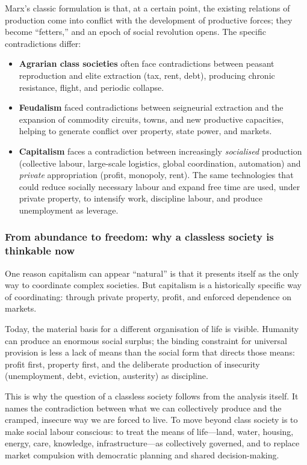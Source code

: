 Marx’s classic formulation is that, at a certain point, the existing relations of production come into conflict with the development of
productive forces; they become ``fetters,'' and an epoch of social revolution opens.\cite{Marx1859} The specific contradictions differ:

\begin{itemize}[leftmargin=1.5em]
  \item \textbf{Agrarian class societies} often face contradictions between peasant reproduction and elite extraction (tax, rent, debt),
        producing chronic resistance, flight, and periodic collapse.\cite{Scott2017}
  \item \textbf{Feudalism} faced contradictions between seigneurial extraction and the expansion of commodity circuits, towns, and new
        productive capacities, helping to generate conflict over property, state power, and markets.\cite{Heller2011}
  \item \textbf{Capitalism} faces a contradiction between increasingly \emph{socialised} production (collective labour, large-scale logistics,
        global coordination, automation) and \emph{private} appropriation (profit, monopoly, rent). The same technologies that could reduce
        socially necessary labour and expand free time are used, under private property, to intensify work, discipline labour, and produce
        unemployment as leverage.\cite{Marx1867}
\end{itemize}

\subsubsection{From abundance to freedom: why a classless society is thinkable now}
\label{sec:abundance-freedom}

One reason capitalism can appear ``natural'' is that it presents itself as the only way to coordinate complex societies. But capitalism is a
historically specific way of coordinating: through private property, profit, and enforced dependence on markets.

Today, the material basis for a different organisation of life is visible. Humanity can produce an enormous social surplus; the binding constraint
for universal provision is less a lack of means than the social form that directs those means: profit first, property first, and the deliberate
production of insecurity (unemployment, debt, eviction, austerity) as discipline.\cite{Marx1867}

This is why the question of a classless society follows from the analysis itself. It names the contradiction between what we can collectively produce and the cramped, insecure way we are forced to live. To move beyond class society is to make social labour conscious: to treat the means of life---land,
water, housing, energy, care, knowledge, infrastructure---as collectively governed, and to replace market compulsion with democratic planning and shared
decision-making.

